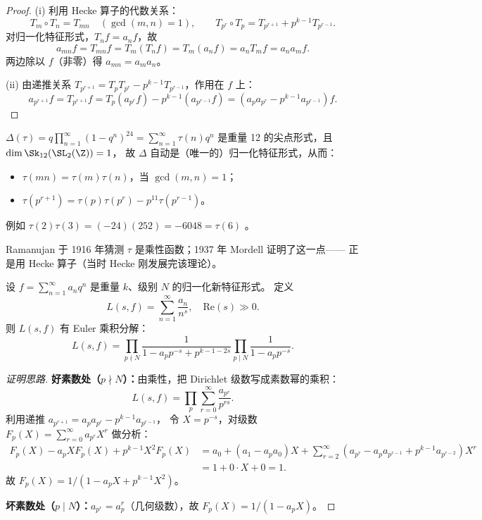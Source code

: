 \begin{proof}
(i) 利用 Hecke 算子的代数关系：
\[
  T_m \circ T_n = T_{mn} \quad (\gcd(m,n)=1), \qquad
  T_{p^r} \circ T_p = T_{p^{r+1}} + p^{k-1} T_{p^{r-1}}.
\]
对归一化特征形式，$T_n f = a_n f$，故
\[
  a_{mn} f = T_{mn} f = T_m(T_n f) = T_m(a_n f) = a_n T_m f = a_n a_m f.
\]
两边除以 $f$（非零）得 $a_{mn} = a_m a_n$。

(ii) 由递推关系 $T_{p^{r+1}} = T_p T_{p^r} - p^{k-1} T_{p^{r-1}}$，作用在 $f$ 上：
\[
  a_{p^{r+1}} f = T_{p^{r+1}} f
  = T_p(a_{p^r} f) - p^{k-1}(a_{p^{r-1}} f)
  = (a_p a_{p^r} - p^{k-1} a_{p^{r-1}}) f.
\]
\end{proof}

\begin{example}
\label{ex:tau-multiplicativity}
$\Delta(\tau) = q\prod_{n=1}^\infty(1-q^n)^{24} = \sum_{n=1}^\infty \tau(n)q^n$
是重量 12 的尖点形式，且 $\dim \Sk_{12}(\SL_2(\Z)) = 1$，
故 $\Delta$ 自动是（唯一的）归一化特征形式，从而：
\begin{itemize}
  \item $\tau(mn) = \tau(m)\tau(n)$，当 $\gcd(m,n)=1$；
  \item $\tau(p^{r+1}) = \tau(p)\tau(p^r) - p^{11}\tau(p^{r-1})$。
\end{itemize}
例如 $\tau(2)\tau(3) = (-24)(252) = -6048 = \tau(6)$ \checkmark。

Ramanujan 于 1916 年猜测 $\tau$ 是乘性函数；1937 年 Mordell 证明了这一点——
正是用 Hecke 算子（当时 Hecke 刚发展完该理论）。
\end{example}

\begin{theorem}
\label{thm:L-function-euler-product}
设 $f = \sum_{n=1}^\infty a_n q^n$ 是重量 $k$、级别 $N$ 的归一化新特征形式。
定义
\[
  L(s, f) = \sum_{n=1}^{\infty} \frac{a_n}{n^s}, \quad \mathrm{Re}(s) \gg 0.
\]
则 $L(s,f)$ 有 Euler 乘积分解：
\[
  L(s, f)
  = \prod_{p \nmid N} \frac{1}{1 - a_p p^{-s} + p^{k-1-2s}}
    \prod_{p \mid N} \frac{1}{1 - a_p p^{-s}}.
\]
\end{theorem}



\begin{proof}[证明思路]
\textbf{好素数处（$p \nmid N$）：}由乘性，把 Dirichlet 级数写成素数幂的乘积：
\[
  L(s,f) = \prod_p \sum_{r=0}^\infty \frac{a_{p^r}}{p^{rs}}.
\]
利用递推 $a_{p^{r+1}} = a_p a_{p^r} - p^{k-1}a_{p^{r-1}}$，
令 $X = p^{-s}$，对级数 $F_p(X) = \sum_{r=0}^\infty a_{p^r} X^r$ 做分析：
\begin{align}
  F_p(X) - a_p X F_p(X) + p^{k-1} X^2 F_p(X)
  &= a_0 + (a_1 - a_p a_0) X + \sum_{r=2}^\infty (a_{p^r} - a_p a_{p^{r-1}} + p^{k-1}a_{p^{r-2}}) X^r \\
  &= 1 + 0 \cdot X + 0 = 1.
\end{align}
故 $F_p(X) = 1/(1 - a_p X + p^{k-1} X^2)$。

\textbf{坏素数处（$p \mid N$）：}$a_{p^r} = a_p^r$（几何级数），故
$F_p(X) = 1/(1 - a_p X)$。
\end{proof}

